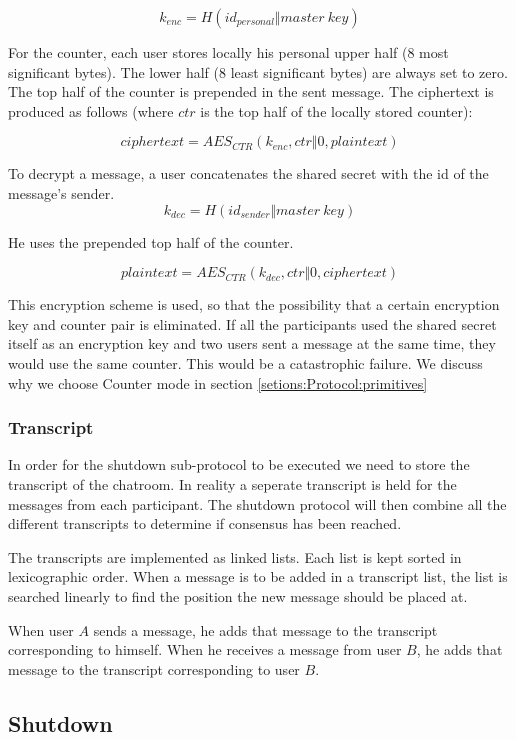 \[
k_{enc} = H(id_{personal} \Vert master\ key)
\]

For the counter, each user stores locally his personal upper half (8 most significant bytes).
The lower half (8 least significant bytes) are always set to zero.
The top half of the counter is prepended in the sent message.
The ciphertext is produced as follows (where $ctr$ is the top half of the locally stored counter):

\[
ciphertext = AES_{CTR}(k_{enc}, ctr \Vert 0, plaintext)
\]

To decrypt a message, a user concatenates the shared secret with the id of the message's sender.
\[
k_{dec} = H(id_{sender} \Vert master\ key)
\]

He uses the prepended top half of the counter.

\[
plaintext = AES_{CTR}(k_{dec}, ctr \Vert 0, ciphertext)
\]

This encryption scheme is used, so that the possibility that a certain encryption key and counter pair is eliminated.
If all the participants used the shared secret itself as an encryption key and two users sent a message at the same time, they would use the same counter.
This would be a catastrophic failure.
We discuss why we choose Counter mode in section \ref{setions:Protocol:primitives}

\subsubsection{Transcript}
In order for the shutdown sub-protocol to be executed we need to store the transcript of the chatroom. In reality a seperate transcript is held for the messages from each participant.
The shutdown protocol will then combine all the different transcripts to determine if consensus has been reached.

The transcripts are implemented as linked lists. Each list is kept sorted in lexicographic order.
When a message is to be added in a transcript list, the list is searched linearly to find the position the new message should be placed at.

When user $A$ sends a message, he adds that message to the transcript corresponding to himself.
When he receives a message from user $B$, he adds that message to the transcript corresponding to user $B$.

\subsection{Shutdown}
\label{subsections:shutdown}

